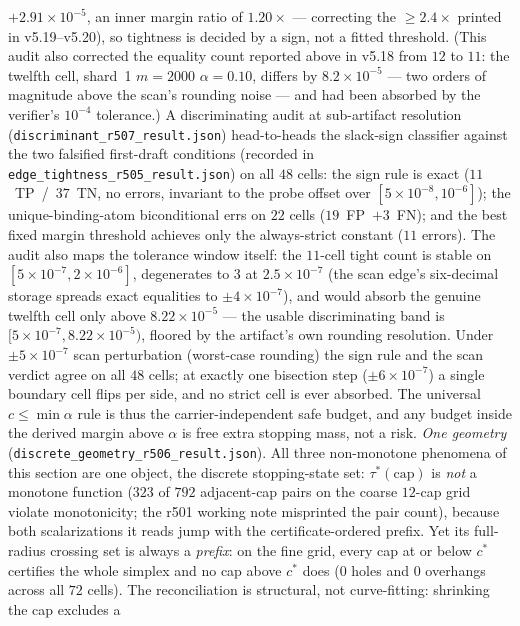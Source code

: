 \documentclass{article}
\theoremstyle{definition}
\theoremstyle{remark}
\begin{document}
$+2.91\times10^{-5}$, an inner margin ratio of $1.20\times$ ---
correcting the ${\ge}2.4\times$ printed in v5.19--v5.20), so tightness
is decided by a sign, not a fitted threshold. (This audit also corrected
the equality count reported above in v5.18 from $12$ to $11$: the
twelfth cell, shard~1 $m{=}2000$ $\alpha{=}0.10$, differs by
$8.2\times10^{-5}$ --- two orders of magnitude above the scan's
rounding noise --- and had been absorbed by the verifier's $10^{-4}$
tolerance.) A discriminating audit at sub-artifact resolution
(\texttt{discriminant\_r507\_result.json}) head-to-heads the slack-sign
classifier against the two falsified first-draft conditions (recorded
in \texttt{edge\_tightness\_r505\_result.json}) on all $48$ cells: the
sign rule is exact
($11$~TP~/~$37$~TN, no errors, invariant to the probe offset over
$[5\times10^{-8},10^{-6}]$); the unique-binding-atom biconditional errs
on $22$ cells ($19$~FP~$+3$~FN); and the best fixed margin threshold
achieves only the always-strict constant ($11$ errors). The audit also
maps the tolerance window itself: the $11$-cell tight count is stable on
$[5\times10^{-7},2\times10^{-6}]$, degenerates to $3$ at
$2.5\times10^{-7}$ (the scan edge's six-decimal storage spreads exact
equalities to $\pm4\times10^{-7}$), and would absorb the genuine twelfth
cell only above $8.22\times10^{-5}$ --- the usable discriminating band
is $[5\times10^{-7},8.22\times10^{-5})$, floored by the artifact's own
rounding resolution. Under $\pm5\times10^{-7}$ scan perturbation
(worst-case rounding) the sign rule and the scan verdict agree on all
$48$ cells; at exactly one bisection step ($\pm6\times10^{-7}$) a single
boundary cell flips per side, and no strict cell is ever absorbed. The universal $c\le\min\alpha$ rule is thus the
carrier-independent safe budget, and any budget inside the derived
margin above $\alpha$ is free extra stopping mass, not a risk.
\emph{One geometry} (\texttt{discrete\_geometry\_r506\_result.json}).
All three non-monotone phenomena of this section are one object, the
discrete stopping-state set: $\tau^*(\text{cap})$ is \emph{not} a
monotone function ($323$ of $792$ adjacent-cap pairs on the coarse
$12$-cap grid violate monotonicity; the r501 working note misprinted
the pair count), because both scalarizations it reads jump with the
certificate-ordered prefix. Yet its full-radius crossing set is
always a \emph{prefix}: on the fine grid, every cap at or below $c^*$
certifies the whole simplex and no cap above $c^*$ does ($0$ holes
and $0$ overhangs across all $72$ cells). The reconciliation is
structural, not curve-fitting: shrinking the cap excludes a
\end{document}
